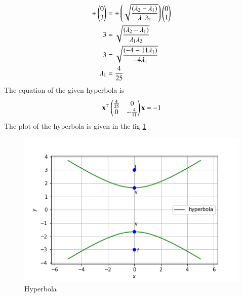\documentclass[journal,12pt,twocolumn]{IEEEtran}
\begin{document}
\begin{align}
    \pm \begin{pmatrix}0\\ 3\end{pmatrix} &= \pm \left(\sqrt{\frac{(\lambda_2-\lambda_1)}{\lambda_1 \lambda_2}}\right) \begin{pmatrix}0\\1\end{pmatrix}\\
    3 &= \sqrt{\frac{(\lambda_2-\lambda_1)}{\lambda_1 \lambda_2}}\\
    3 &= \sqrt{\frac{(-4-11\lambda_1)}{-4\lambda_1 }}\\
    \lambda_1 &= \frac{4}{25}
\end{align}
The equation of the given hyperbola is
\begin{equation}
    \mathbf{x}^{\top}\begin{pmatrix}\frac{4}{25} & 0 \\ 0 & -\frac{4}{11}\end{pmatrix}\mathbf{x} = -1
\end{equation}
The plot of the hyperbola is given in the fig \ref{fig:1}
\begin{figure}[H]
\centering
    \includegraphics[width= \columnwidth]{assignment7.png}
    \caption{Hyperbola} \label{fig:1}
\end{figure}
\end{document}
